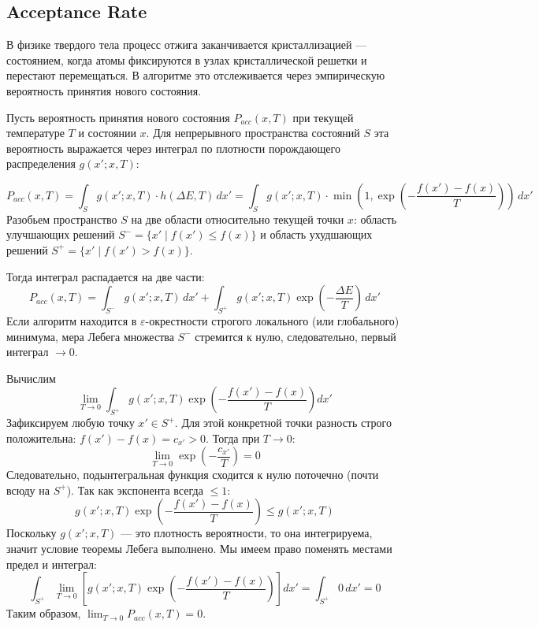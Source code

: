 \subsection{Acceptance Rate}
В физике твердого тела процесс отжига заканчивается кристаллизацией — состоянием, когда атомы фиксируются в узлах кристаллической решетки и перестают перемещаться. В алгоритме это отслеживается через эмпирическую вероятность принятия нового состояния.

Пусть вероятность принятия нового состояния $P_{acc}(x, T)$ при текущей температуре $T$ и состоянии $x$. Для непрерывного пространства состояний $S$ эта вероятность выражается через интеграл по плотности порождающего распределения $g(x'; x, T)$:

$$P_{acc}(x, T) = \int_{S} g(x'; x, T) \cdot h(\Delta E, T) \, dx' = \int_{S} g(x'; x, T) \cdot \min\left(1, \exp\left(-\frac{f(x') - f(x)}{T}\right)\right) \, dx'$$
Разобьем пространство $S$ на две области относительно текущей точки $x$: область улучшающих решений $S^- = \{x' \mid f(x') \le f(x)\}$ и область ухудшающих решений $S^+ = \{x' \mid f(x') > f(x)\}$. 

Тогда интеграл распадается на две части:
$$P_{acc}(x, T) = \int_{S^-} g(x'; x, T) \, dx' + \int_{S^+} g(x'; x, T) \exp\left(-\frac{\Delta E}{T}\right) \, dx'$$
Если алгоритм находится в $\varepsilon$-окрестности строгого локального (или глобального) минимума, мера Лебега множества $S^-$ стремится к нулю, следовательно, первый интеграл $\to 0$. 

Вычислим $$ \lim_{T \to 0} \int_{S^+} g(x'; x, T) \exp\left(-\frac{f(x') - f(x)}{T}\right) dx' $$
Зафиксируем любую точку $x' \in S^+$. Для этой конкретной точки разность строго положительна: $f(x') - f(x) = c_{x'} > 0$.
Тогда при $T \to 0$:
$$ \lim_{T \to 0} \exp\left(-\frac{c_{x'}}{T}\right) = 0 $$
Следовательно, подынтегральная функция сходится к нулю поточечно (почти всюду на $S^+$).
Так как экспонента всегда $\le 1$:
$$ g(x'; x, T) \exp\left(-\frac{f(x') - f(x)}{T}\right) \le g(x'; x, T) $$
Поскольку $g(x'; x, T)$ — это плотность вероятности, то она интегрируема, значит условие теоремы Лебега выполнено. 
Мы имеем право поменять местами предел и интеграл:
$$ \int_{S^+} \lim_{T \to 0} \left[ g(x'; x, T) \exp\left(-\frac{f(x') - f(x)}{T}\right) \right] dx' = \int_{S^+} 0 \, dx' = 0 $$
Таким образом, $\displaystyle \lim_{T \to 0} P_{acc}(x, T) = 0$. 

